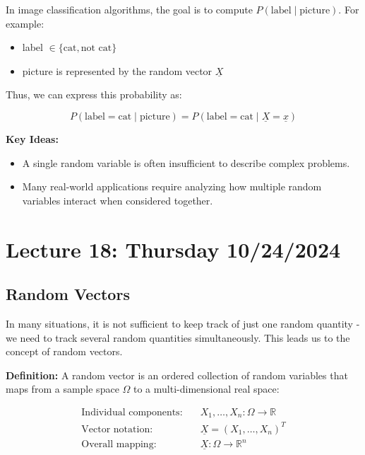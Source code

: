 \documentclass{article}
\begin{document}
    In image classification algorithms, the goal is to compute $P(\text{label} \mid \text{picture})$. For example:

    \begin{itemize}
        \item label $\in \{\text{cat}, \text{not cat}\}$
        \item picture is represented by the random vector $\underline{X}$
    \end{itemize}

    Thus, we can express this probability as:

    \[P(\text{label} = \text{cat} \mid \text{picture}) = P(\text{label} = \text{cat} \mid \underline{X} = \underline{x})\]

    \textbf{Key Ideas:}
    \begin{itemize}
        \item A single random variable is often insufficient to describe complex problems.
        \item Many real-world applications require analyzing how multiple random variables interact when considered together.
    \end{itemize}

    \section*{Lecture 18: Thursday 10/24/2024}
 
    \subsection*{Random Vectors}

    In many situations, it is not sufficient to keep track of just one random quantity - we need to track several random quantities simultaneously. This leads us to the concept of random vectors.

    \textbf{Definition:} A random vector is an ordered collection of random variables that maps from a sample space $\Omega$ to a multi-dimensional real space:

    \begin{align*}
        \text{Individual components:} \quad & X_1, \ldots, X_n : \Omega \rightarrow \mathbb{R} \\
        \text{Vector notation:} \quad & \underline{X} = (X_1, \ldots, X_n)^T \\
        \text{Overall mapping:} \quad & \underline{X} : \Omega \rightarrow \mathbb{R}^n
    \end{align*}
\end{document}
